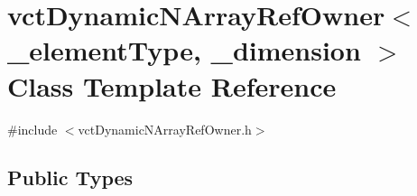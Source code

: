 \hypertarget{classvct_dynamic_n_array_ref_owner}{\section{vct\-Dynamic\-N\-Array\-Ref\-Owner$<$ \-\_\-element\-Type, \-\_\-dimension $>$ Class Template Reference}
\label{classvct_dynamic_n_array_ref_owner}
}


{\ttfamily \#include $<$vct\-Dynamic\-N\-Array\-Ref\-Owner.\-h$>$}

\subsection*{Public Types}
